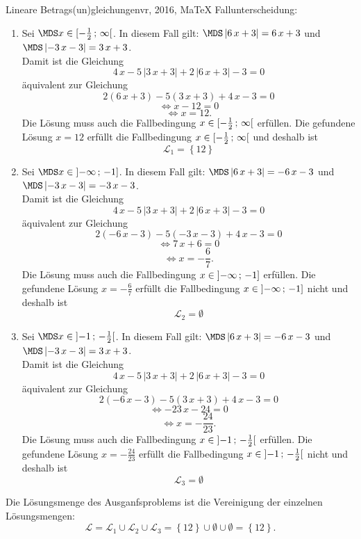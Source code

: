 \begin{MAufgabe}{Lineare Betrags(un)gleichungen}{vr, 2016, MaTeX}
 Fallunterscheidung: 

 \begin{enumerate} 
 \item Sei $ \MDS x\in[ - \frac{1}{2} \, \MIntvlSep \, \infty\MoIr $. 
 In diesem Fall gilt: 
  $ \MDS \left| 6\, x + 3\right|=6\, x + 3$ und $ \MDS \left|  - 3\, x - 3\right|=3\, x + 3$. \\ 
 Damit ist die Gleichung 
 $$ 
4\, x - 5\, \left|3\, x + 3\right| + 2\, \left|6\, x + 3\right| - 3= 0
$$
 \"aquivalent zur Gleichung
 $$ 
2\left(6\, x + 3\right)-5\left( 3\, x + 3\right)+4\, x-3= 0 
$$  
$$ 
 \Leftrightarrow x - 12= 0 
$$  
$$ \Leftrightarrow x = 12 . 
 $$ 
 Die L\"osung muss auch die Fallbedingung $x\in [ - \frac{1}{2} \, ; \, \infty[\mbox{}  $ erf\"ullen. Die gefundene L\"osung $x=12$ erf\"ullt die Fallbedingung  $x\in [ - \frac{1}{2} \, ; \, \infty[\mbox{} $ und deshalb ist  $$
 \mathcal{L}_{1}=\left\{12\right\}
 $$ 
\item Sei $ \MDS x\in\MoIl  -\infty \, \MIntvlSep \, -1]$. 
 In diesem Fall gilt: 
  $ \MDS \left| 6\, x + 3\right|= - 6\, x - 3$ und $ \MDS \left|  - 3\, x - 3\right|= - 3\, x - 3$. \\ 
 Damit ist die Gleichung 
 $$ 
4\, x - 5\, \left|3\, x + 3\right| + 2\, \left|6\, x + 3\right| - 3= 0
$$
 \"aquivalent zur Gleichung
 $$ 
2\left( - 6\, x - 3\right)-5\left(  - 3\, x - 3\right)+4\, x-3= 0 
$$  
$$ 
 \Leftrightarrow 7\, x + 6= 0 
$$  
$$ \Leftrightarrow x = - \frac{6}{7} . 
 $$ 
 Die L\"osung muss auch die Fallbedingung $x\in \mbox{}]\mathopen{}  -\infty \, ; \, -1] $ erf\"ullen. Die gefundene L\"osung $x=- \frac{6}{7}$ erf\"ullt die Fallbedingung  $x\in \mbox{}]\mathopen{}  -\infty \, ; \, -1]$ nicht und deshalb ist  $$
 \mathcal{L}_{2}=\emptyset 
 $$ 
\item Sei $ \MDS x\in\MoIl  -1 \, \MIntvlSep \, - \frac{1}{2}\MoIr $. 
 In diesem Fall gilt: 
  $ \MDS \left| 6\, x + 3\right|= - 6\, x - 3$ und $ \MDS \left|  - 3\, x - 3\right|=3\, x + 3$. \\ 
 Damit ist die Gleichung 
 $$ 
4\, x - 5\, \left|3\, x + 3\right| + 2\, \left|6\, x + 3\right| - 3= 0
$$
 \"aquivalent zur Gleichung
 $$ 
2\left( - 6\, x - 3\right)-5\left( 3\, x + 3\right)+4\, x-3= 0 
$$  
$$ 
 \Leftrightarrow  - 23\, x - 24= 0 
$$  
$$ \Leftrightarrow x = - \frac{24}{23} . 
 $$ 
 Die L\"osung muss auch die Fallbedingung $x\in \mbox{}]\mathopen{}  -1 \, ; \, - \frac{1}{2}[\mbox{}  $ erf\"ullen. Die gefundene L\"osung $x=- \frac{24}{23}$ erf\"ullt die Fallbedingung  $x\in \mbox{}]\mathopen{}  -1 \, ; \, - \frac{1}{2}[\mbox{} $ nicht und deshalb ist  $$
 \mathcal{L}_{3}=\emptyset 
 $$ 
 \end{enumerate} 
  Die L\"osungsmenge des Ausganfsproblems ist die Vereinigung der einzelnen L\"osungsmengen: 
$$ \mathcal{L} = \mathcal{L}_{1} \cup \mathcal{L}_{2} \cup \mathcal{L}_{3} 
 = \left\{12\right\}\cup \emptyset\cup \emptyset 
  =\left\{12\right\} 
   . $$ 
 

\end{MAufgabe}
